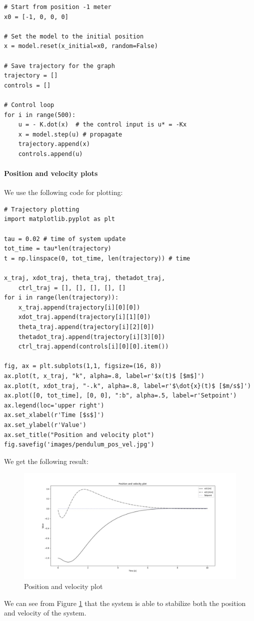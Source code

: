 \begin{verbatim}
# Start from position -1 meter
x0 = [-1, 0, 0, 0] 

# Set the model to the initial position
x = model.reset(x_initial=x0, random=False)

# Save trajectory for the graph
trajectory = []
controls = []

# Control loop
for i in range(500):
    u = - K.dot(x)  # the control input is u* = -Kx
    x = model.step(u) # propagate
    trajectory.append(x)
    controls.append(u)
\end{verbatim}

\paragraph{Position and velocity plots}
We use the following code for plotting: 
\begin{verbatim}
# Trajectory plotting
import matplotlib.pyplot as plt

tau = 0.02 # time of system update
tot_time = tau*len(trajectory)
t = np.linspace(0, tot_time, len(trajectory)) # time

x_traj, xdot_traj, theta_traj, thetadot_traj, 
    ctrl_traj = [], [], [], [], []
for i in range(len(trajectory)):
    x_traj.append(trajectory[i][0][0])
    xdot_traj.append(trajectory[i][1][0])
    theta_traj.append(trajectory[i][2][0])
    thetadot_traj.append(trajectory[i][3][0])
    ctrl_traj.append(controls[i][0][0].item())
    
fig, ax = plt.subplots(1,1, figsize=(16, 8))
ax.plot(t, x_traj, "k", alpha=.8, label=r'$x(t)$ [$m$]')
ax.plot(t, xdot_traj, "-.k", alpha=.8, label=r'$\dot{x}(t)$ [$m/s$]')
ax.plot([0, tot_time], [0, 0], ":b", alpha=.5, label=r'Setpoint')
ax.legend(loc='upper right')
ax.set_xlabel(r'Time [$s$]')
ax.set_ylabel(r'Value')
ax.set_title("Position and velocity plot")
fig.savefig('images/pendulum_pos_vel.jpg')
\end{verbatim}
We get the following result:
\begin{figure}[h!]
    \centering
    \includegraphics[width=\textwidth]{images/1-pendulum_pos_vel.jpg}
    \caption{Position and velocity plot}
    \label{fig:cartpole_posvel}
\end{figure}
We can see from Figure \ref{fig:cartpole_posvel} that the system is able to stabilize both the position and velocity of the system.

